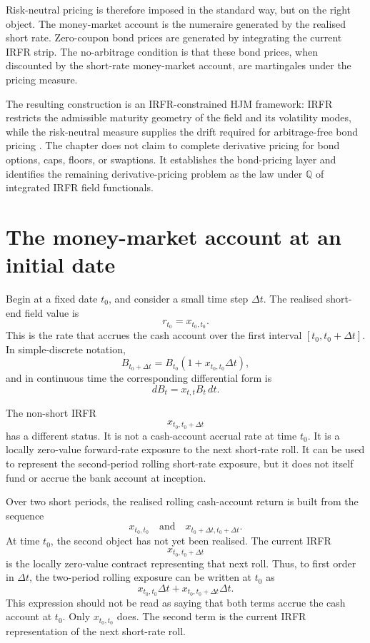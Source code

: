 \documentclass[11pt,oneside]{book}
\begin{document}
Risk-neutral pricing is therefore imposed in the standard way, but on the
right object. The money-market account is the numeraire generated by the
realised short rate. Zero-coupon bond prices are generated by integrating
the current IRFR strip. The no-arbitrage condition is that these bond
prices, when discounted by the short-rate money-market account, are
martingales under the pricing measure.

The resulting construction is an IRFR-constrained HJM framework: IRFR
restricts the admissible maturity geometry of the field and its volatility
modes, while the risk-neutral measure supplies the drift required for
arbitrage-free bond pricing \cite{HeathJarrowMorton1992,MusielaRutkowski2005}.
The chapter does not claim to complete derivative pricing for bond
options, caps, floors, or swaptions. It establishes the bond-pricing layer
and identifies the remaining derivative-pricing problem as the law under
\(\mathbb Q\) of integrated IRFR field functionals.

\section{The money-market account at an initial date}
\label{money-market-account-at-an-initial-date}

Begin at a fixed date \(t_0\), and consider a small time step \(\Delta t\).
The realised short-end field value is
\[
r_{t_0}=x_{t_0,t_0}.
\]
This is the rate that accrues the cash account over the first interval
\([t_0,t_0+\Delta t]\). In simple-discrete notation,
\[
B_{t_0+\Delta t}
=
B_{t_0}\left(1+x_{t_0,t_0}\Delta t\right),
\]
and in continuous time the corresponding differential form is
\[
dB_t=x_{t,t}B_t\,dt.
\]

The non-short IRFR
\[
x_{t_0,t_0+\Delta t}
\]
has a different status. It is not a cash-account accrual rate at time
\(t_0\). It is a locally zero-value forward-rate exposure to the next
short-rate roll. It can be used to represent the second-period rolling
short-rate exposure, but it does not itself fund or accrue the bank
account at inception.

Over two short periods, the realised rolling cash-account return is built
from the sequence
\[
x_{t_0,t_0}
\quad\text{and}\quad
x_{t_0+\Delta t,t_0+\Delta t}.
\]
At time \(t_0\), the second object has not yet been realised. The current
IRFR
\[
x_{t_0,t_0+\Delta t}
\]
is the locally zero-value contract representing that next roll. Thus, to
first order in \(\Delta t\), the two-period rolling exposure can be written
at \(t_0\) as
\[
x_{t_0,t_0}\Delta t+x_{t_0,t_0+\Delta t}\Delta t.
\]
This expression should not be read as saying that both terms accrue the
cash account at \(t_0\). Only \(x_{t_0,t_0}\) does. The second term is the
current IRFR representation of the next short-rate roll.
\end{document}
